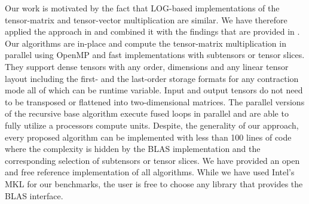 Our work is motivated by the fact that LOG-based implementations of the tensor-matrix and tensor-vector multiplication are similar. 
We have therefore applied the approach in \cite{bassoy:2019:ttv} and combined it with the findings that are provided in \cite{li:2015:input}.
Our algorithms are in-place and compute the tensor-matrix multiplication in parallel using OpenMP and fast  implementations with subtensors or tensor slices.
They support dense tensors with any order, dimensions and any linear tensor layout including the first- and the last-order storage formats for any contraction mode all of which can be runtime variable.
Input and output tensors do not need to be transposed or flattened into two-dimensional matrices.
The parallel versions of the recursive base algorithm execute fused loops in parallel and are able to fully utilize a processors compute units.
Despite, the generality of our approach, every proposed algorithm can be implemented with less than 100 lines of  code where the complexity is hidden by the BLAS implementation and the corresponding selection of subtensors or tensor slices.
We have provided an open and free reference implementation of all algorithms.
While we have used Intel's MKL for our benchmarks, the user is free to choose any library that provides the BLAS interface.

